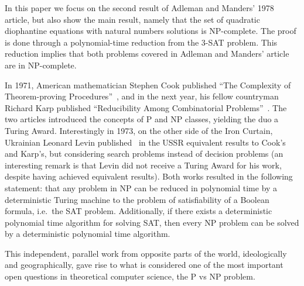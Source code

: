 \documentclass{amsart}
\theoremstyle{plain}
\numberwithin{equation}{section}
\begin{document}
In this paper we focus on the second result of Adleman and Manders' 1978 article, but also show the
main result, namely that the set of quadratic diophantine equations with natural numbers solutions
is NP-complete. The proof is done through a polynomial-time reduction from the 3-SAT problem. This
reduction implies that both problems covered in Adleman and Manders' article are in NP-complete.

In 1971, American mathematician Stephen Cook published ``The Complexity of Theorem-proving
Procedures''~\cite{cook}, and in the next year, his fellow countryman Richard Karp published
``Reducibility Among Combinatorial Problems''~\cite{karp}. The two articles introduced the concepts
of P and NP classes, yielding the duo a Turing Award. Interestingly in 1973, on the other side of
the Iron Curtain, Ukrainian Leonard Levin published~\cite{levin} in the USSR equivalent results to
Cook's and Karp's, but considering search problems instead of decision problems (an interesting
remark is that Levin did not receive a Turing Award for his work, despite having achieved
equivalent results). Both works resulted in the following statement: that any problem in NP can be
reduced in polynomial time by a deterministic Turing machine to the problem of satisfiability of a
Boolean formula, i.e.\ the SAT problem.  Additionally, if there exists a deterministic polynomial
time algorithm for solving SAT, then every NP problem can be solved by a deterministic polynomial
time algorithm.

This independent, parallel work from opposite parts of the world, ideologically and geographically,
gave rise to what is considered one of the most important open questions in theoretical computer
science, the P vs NP problem.
\end{document}

